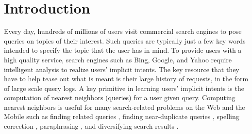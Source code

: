 
 \section{Introduction}
Every day, 
hundreds of millions of users visit commercial search engines to pose
queries on topics of their interest.  
Such queries are typically just a few key words intended to specify
the topic that the user has in mind. 
To provide users with a high quality service, 
search engines such as Bing, Google, and Yahoo require
intelligent analysis to realize users' implicit intents.
The key resource that they have to help tease out what is meant is
their large history of requests, in the form of large scale query logs.  
A key primitive in 
learning users' implicit intents is the computation of 
nearest neighbors (queries) for a user given query. 
Computing nearest neighbors is useful for 
many search-related problems on the Web and the Mobile such as 
finding related queries \cite{Jones06WWW,Jain11SIGIR,Song12WSDM}, 
finding near-duplicate queries \cite{}, spelling correction \cite{},  
paraphrasing \cite{petrovicNAACL12,ganitkevitch13Paraphrase}, 
and diversifying search results \cite{Song11SIGIR}.  

